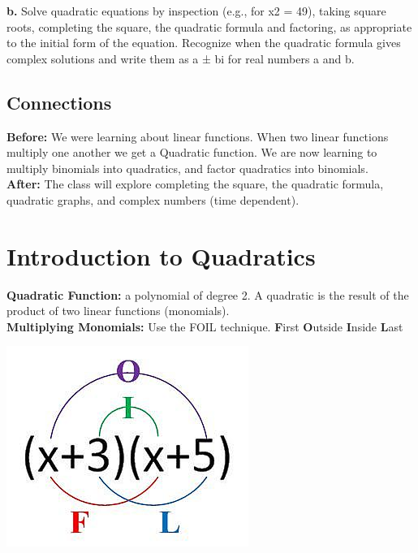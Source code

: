 \documentclass[11pt]{article}
\begin{document}
\textbf{b.} Solve quadratic equations by inspection (e.g., for x2 = 49), taking
square roots, completing the square, the quadratic formula and
factoring, as appropriate to the initial form of the equation.
Recognize when the quadratic formula gives complex solutions
and write them as a ± bi for real numbers a and b.\\




\subsection*{Connections}

\textbf{Before:} We were learning about linear functions. When two linear functions multiply one another we get a Quadratic function. We are now learning to multiply binomials into quadratics, and factor quadratics into binomials.\\



\textbf{After:} The class will explore completing the square, the quadratic formula, quadratic graphs, and complex numbers (time dependent).\\




\section*{Introduction to Quadratics}

\textbf{Quadratic Function:} a polynomial of degree 2. A quadratic is the result of the product of two linear functions (monomials).\\

\textbf{Multiplying Monomials:}  Use the FOIL technique. \textbf{F}irst \textbf{O}utside \textbf{I}nside \textbf{L}ast\\

\begin{center}
\includegraphics[scale=.5]{foil.jpg}\\
\end{center}
\end{document}
